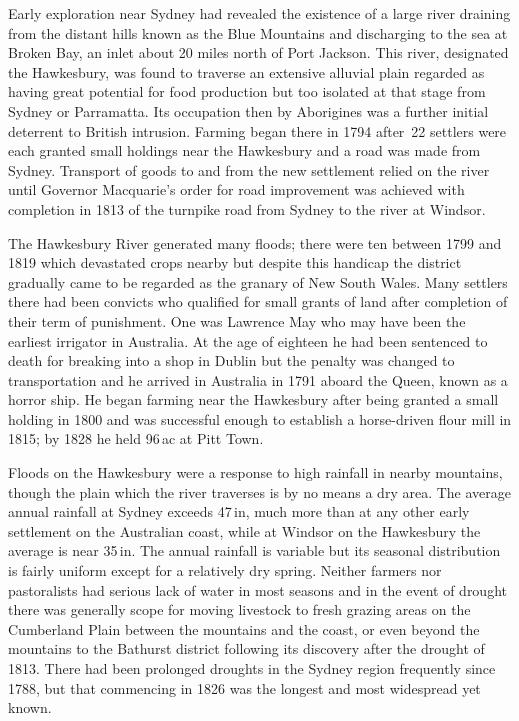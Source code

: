 Early exploration near Sydney had revealed the existence of a large
river draining from the distant hills known as the Blue Mountains and
discharging to the sea at Broken Bay, an inlet about 20 miles north of
Port Jackson.  This river, designated the Hawkesbury, was found to
traverse an extensive alluvial plain regarded as having great
potential for food production but too isolated at that stage from
Sydney or Parramatta.  Its occupation then by Aborigines was a further
initial deterrent to British intrusion.  Farming began there in 1794
after~22 settlers were each granted small holdings near the Hawkesbury
and a road was made from Sydney. Transport of goods to and from the
new settlement relied on the river until Governor Macquarie's order
for road improvement was achieved with completion in 1813 of the
turnpike road from Sydney to the river at Windsor.

The Hawkesbury River generated many floods; there were ten between
1799 and 1819 which devastated crops nearby but despite this handicap
the district gradually came to be regarded as the granary of New South
Wales. Many settlers there had been convicts who qualified for small
grants of land after completion of their term of punishment. One was
Lawrence May who may have been the earliest irrigator in Australia. At
the age of eighteen he had been sentenced to death for breaking into a
shop in Dublin but the penalty was changed to transportation and he
arrived in Australia in 1791 aboard the Queen, known as a horror
ship. He began farming near the Hawkesbury after being granted a small
holding in 1800 and was successful enough to establish a horse-driven
flour mill in 1815; by 1828 he held 96\,ac at Pitt
Town.

Floods on the Hawkesbury were a response to high rainfall in nearby
mountains, though the plain which the river traverses is by no means a
dry area.  The average annual rainfall at Sydney exceeds 47\,in, much
more than at any other early settlement on the Australian coast, while
at Windsor on the Hawkesbury the average is near 35\,in. The annual
rainfall is variable but its seasonal distribution is fairly uniform
except for a relatively dry spring.  Neither farmers nor pastoralists
had serious lack of water in most seasons and in the event of drought
there was generally scope for moving livestock to fresh grazing areas
on the Cumberland Plain between the mountains and the coast, or even
beyond the mountains to the Bathurst district following its discovery
after the drought of 1813.  There had been prolonged droughts in the
Sydney region frequently since 1788, but that commencing in 1826 was
the longest and most widespread yet known.

